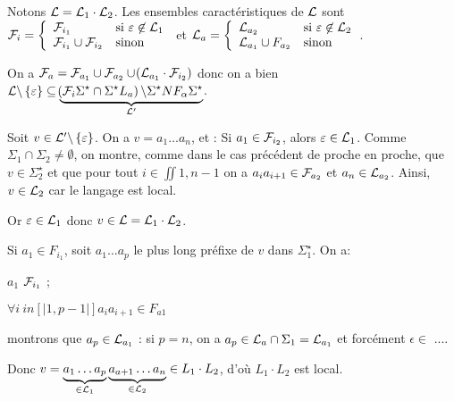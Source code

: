 \documentclass[a4paper,french,bookmarks]{book}
\begin{document}
\begin{nproof}
\begin{psse}
            \item Notons $\mathcal{L} = \mathcal{L}_1 \cdot \mathcal{L}_2$. Les ensembles caractéristiques de $\mathcal{L}$ sont $\mathcal{F}_i = \left\lbrace \begin{array}{ll}
                \mathcal{F}_{i_1} &\text{si} \ \varepsilon \not\in \mathcal{L}_1  \\
                \mathcal{F}_{i_1} \cup \mathcal{F}_{i_2} &\text{sinon} 
            \end{array}\right.$ et $\mathcal{L}_a = \left\lbrace \begin{array}{ll}
                \mathcal{L}_{a_2} &\text{si} \ \varepsilon \not\in \mathcal{L}_2  \\
                \mathcal{L}_{a_1} \cup F_{a_2} &\text{sinon} 
            \end{array}\right.$.
            
            On a $\mathcal{F}_a = \mathcal{F}_{a_1} \cup \mathcal{F}_{a_2} \cup \!\left(\mathcal{L}_{a_1} \cdot \mathcal{F}_{i_2}\right)$ donc on a bien $\mathcal{L} \backslash \left\{\varepsilon\right\} \subseteq \underbrace{\!\left(\mathcal{F}_i \Sigma^\star \cap \Sigma^\star L_a\right) \backslash \Sigma^\star NF_\alpha \Sigma^\star}_{\mathcal{L}'}$.
            
            Soit $v \in \mathcal{L}' \backslash \left\{\varepsilon\right\}$. On a $v = a_1 \dots a_n$, et :
            Si $a_1 \in \mathcal{F}_{i_2}$, alors $\varepsilon \in \mathcal{L}_1$. Comme $\Sigma_1 \cap \Sigma_2 \neq \emptyset$, on montre, comme dans le cas précédent de proche en proche, que $v \in \Sigma_2^\star$ et que pour tout $i \in \iint{1, n-1}$ on a $a_ia_{i+1} \in \mathcal{F}_{a_2}$ et $a_n \in \mathcal{L}_{a_2}$. Ainsi, $v \in \mathcal{L}_2$ car le langage est local.
            
            Or $\varepsilon \in \mathcal{L}_1$ donc $v \in \mathcal{L} = \mathcal{L}_1 \cdot \mathcal{L}_2$.
            
            Si $a_1 \in F_{i_1}$, soit $a_1 \dots a_p$ le plus long préfixe de $v$ dans $\Sigma_1^\star$. On a:
            \begin{enumerate}
                \itt $a_1$ \in $\mathcal{F}_{i_1}$ ;
                
                \itt $\forall i \ in [|1, p-1|] a_i a_{i+1} \in F_{a1} $%
                
                \itt montrons que $a_p \in \mathcal{L}_{a_1}$ : si $p = n$, on a $a_p \in \mathcal{L}_a \cap \Sigma_1 = \mathcal{L}_{a_1}$ et forcément $\epsilon \in $ ....

                Donc $v= \underbrace{a_1 \dots a_p}_{\in \mathcal{L}_1} \underbrace{a_{a+1} \dots a_n}_{\in \mathcal{L}_2} \in L_1 \cdot L_2$, d'où $L_1\cdot L_2$ est local.
                

\end{enumerate}
\end{psse}
\end{nproof}
\end{document}
